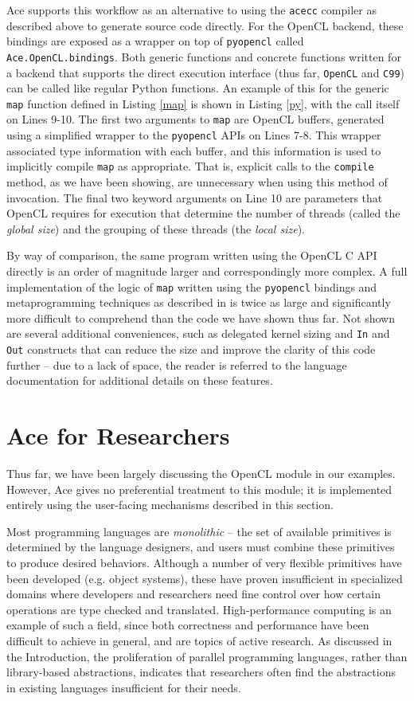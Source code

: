\documentclass[10pt, conference, compsocconf]{IEEEtran}
\begin{document}
Ace supports this workflow as an alternative to using the \verb|acecc| compiler as described above to generate  source code directly. For the OpenCL backend, these bindings are exposed as a wrapper on top of \verb|pyopencl| called \verb|Ace.OpenCL.bindings|. Both generic functions and concrete functions written for a backend that supports the direct execution interface (thus far, \verb|OpenCL| and \verb|C99|) can be called like regular Python functions. An example of this for the generic \verb|map| function defined in Listing \ref{map} is shown in Listing \ref{py}, with the call itself on Lines 9-10. The first two arguments to \verb|map| are OpenCL buffers, generated using a simplified wrapper to the \verb|pyopencl| APIs on Lines 7-8. This wrapper associated type information with each buffer, and this information is used to implicitly compile \verb|map| as appropriate. That is, explicit calls to the \verb|compile| method, as we have been showing, are unnecessary when using this method of invocation. The final two keyword arguments on Line 10 are parameters that OpenCL requires for execution that determine the number of threads (called the {\em global size}) and the grouping of these threads (the {\em local size}). 

By way of comparison, the same program written using the OpenCL C API directly is an order of magnitude larger and correspondingly more complex. A full implementation of the logic of \verb|map| written using the \verb|pyopencl| bindings and metaprogramming techniques as described in \cite{pyopencl} is twice as large and significantly more difficult to comprehend than the code we have shown thus far. Not shown are several additional conveniences, such as delegated kernel sizing and \verb|In| and \verb|Out| constructs that can reduce the size and improve the clarity of this code further -- due to a lack of space, the reader is referred to the language documentation for additional details on these features.

\section{Ace for Researchers}
Thus far, we have been largely discussing the OpenCL module in our examples. However, Ace gives no preferential treatment to this module; it is implemented entirely using the user-facing mechanisms described in this section.

Most programming languages are {\em monolithic} -- the set of available primitives is determined by the language designers, and users must combine these primitives to produce desired behaviors. Although a number of very flexible primitives have been developed (e.g. object systems), these have proven insufficient in specialized domains where developers and researchers need fine control over how certain operations are type checked and translated. High-performance computing is an example of such a field, since both correctness and performance have been difficult to achieve in general, and are topics of active research. As discussed in the Introduction, the proliferation of parallel programming languages, rather than library-based abstractions, indicates that researchers often find the abstractions in existing languages insufficient for their needs.
\end{document}
